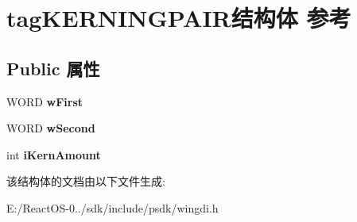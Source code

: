 \hypertarget{structtag_k_e_r_n_i_n_g_p_a_i_r}{}\section{tag\+K\+E\+R\+N\+I\+N\+G\+P\+A\+I\+R结构体 参考}
\label{structtag_k_e_r_n_i_n_g_p_a_i_r}
\subsection*{Public 属性}
\begin{DoxyCompactItemize}
\item 
\mbox{\label{structtag_k_e_r_n_i_n_g_p_a_i_r_a082d3934752dce03feef35284116f744}} 
W\+O\+RD {\bfseries w\+First}
\item 
\mbox{\label{structtag_k_e_r_n_i_n_g_p_a_i_r_a0d68feab458d706860b4f362fe7943bf}} 
W\+O\+RD {\bfseries w\+Second}
\item 
\mbox{\label{structtag_k_e_r_n_i_n_g_p_a_i_r_ac27be965cee271d3fd9c6ee1dde80b7b}} 
int {\bfseries i\+Kern\+Amount}
\end{DoxyCompactItemize}


该结构体的文档由以下文件生成\+:\begin{DoxyCompactItemize}
\item 
E\+:/\+React\+O\+S-\/0../sdk/include/psdk/wingdi.\+h\end{DoxyCompactItemize}

